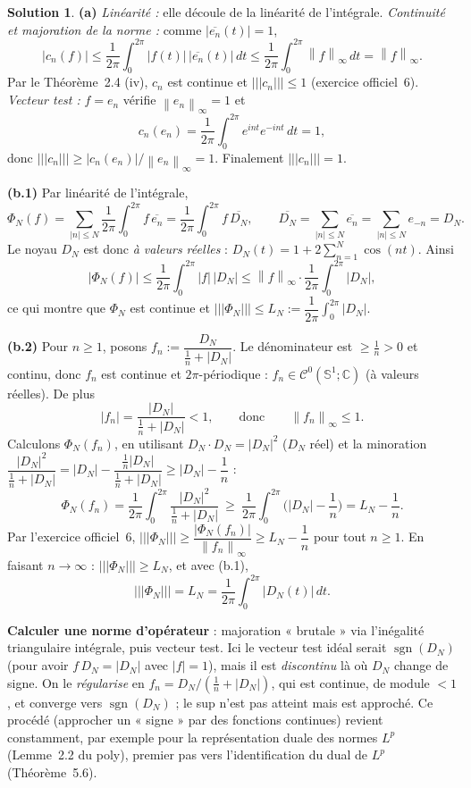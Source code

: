 \documentclass[11pt,a4paper]{article}
\newcommand{\C}{\mathbb{C}}
\newcommand{\Sun}{\mathbb{S}^1}
\newcommand{\norm}[1]{\left\|#1\right\|}
\newcommand{\opnorm}[1]{|\!|\!|#1|\!|\!|}
\newcommand{\Cz}{\mathcal{C}^0}
\DeclareMathOperator{\sgn}{sgn}
\theoremstyle{definition}
\newtheorem*{solution}{Solution}
\begin{document}
\begin{solution}
\noindent\textbf{(a)} \emph{Linéarité :} elle découle de la linéarité de l'intégrale. \emph{Continuité et majoration de la norme :} comme $|\overline{e_n}(t)|=1$,
\[
|c_n(f)|\le\frac1{2\pi}\int_0^{2\pi}|f(t)|\,|\overline{e_n}(t)|\,dt\le\frac1{2\pi}\int_0^{2\pi}\norm f_\infty\,dt=\norm f_\infty .
\]
Par le Théorème~2.4 (iv), $c_n$ est continue et $\opnorm{c_n}\le1$ (exercice officiel~6). \emph{Vecteur test :} $f=e_n$ vérifie $\norm{e_n}_\infty=1$ et
\[
c_n(e_n)=\frac1{2\pi}\int_0^{2\pi}e^{int}e^{-int}\,dt=1 ,
\]
donc $\opnorm{c_n}\ge|c_n(e_n)|/\norm{e_n}_\infty=1$. Finalement $\opnorm{c_n}=1$.

\medskip
\noindent\textbf{(b.1)} Par linéarité de l'intégrale,
\[
\Phi_N(f)=\sum_{|n|\le N}\frac1{2\pi}\int_0^{2\pi}f\,\overline{e_n}=\frac1{2\pi}\int_0^{2\pi}f\,\overline{D_N},
\qquad\overline{D_N}=\sum_{|n|\le N}\overline{e_n}=\sum_{|n|\le N}e_{-n}=D_N .
\]
Le noyau $D_N$ est donc \emph{à valeurs réelles} : $D_N(t)=1+2\sum_{n=1}^N\cos(nt)$. Ainsi
\[
|\Phi_N(f)|\le\frac1{2\pi}\int_0^{2\pi}|f|\,|D_N|\le\norm f_\infty\cdot\frac1{2\pi}\int_0^{2\pi}|D_N| ,
\]
ce qui montre que $\Phi_N$ est continue et $\opnorm{\Phi_N}\le L_N:=\dfrac1{2\pi}\displaystyle\int_0^{2\pi}|D_N|$.

\medskip
\noindent\textbf{(b.2)} Pour $n\ge1$, posons $f_n:=\dfrac{D_N}{\frac1n+|D_N|}$. Le dénominateur est $\ge\frac1n>0$ et continu, donc $f_n$ est continue et $2\pi$-périodique : $f_n\in\Cz(\Sun;\C)$ (à valeurs réelles). De plus
\[
|f_n|=\frac{|D_N|}{\frac1n+|D_N|}<1,\qquad\text{donc}\qquad\norm{f_n}_\infty\le1 .
\]
Calculons $\Phi_N(f_n)$, en utilisant $D_N\cdot D_N=|D_N|^2$ ($D_N$ réel) et la minoration $\dfrac{|D_N|^2}{\frac1n+|D_N|}=|D_N|-\dfrac{\frac1n|D_N|}{\frac1n+|D_N|}\ge|D_N|-\dfrac1n$ :
\[
\Phi_N(f_n)=\frac1{2\pi}\int_0^{2\pi}\frac{|D_N|^2}{\frac1n+|D_N|}\ \ge\ \frac1{2\pi}\int_0^{2\pi}\Big(|D_N|-\frac1n\Big)=L_N-\frac1n .
\]
Par l'exercice officiel~6, $\opnorm{\Phi_N}\ge\dfrac{|\Phi_N(f_n)|}{\norm{f_n}_\infty}\ge L_N-\dfrac1n$ pour tout $n\ge1$. En faisant $n\to\infty$ : $\opnorm{\Phi_N}\ge L_N$, et avec (b.1),
\[
\opnorm{\Phi_N}=L_N=\frac1{2\pi}\int_0^{2\pi}|D_N(t)|\,dt .
\]
\end{solution}

\begin{pointcle}
\textbf{Calculer une norme d'opérateur} : majoration « brutale » via l'inégalité triangulaire intégrale, puis vecteur test. Ici le vecteur test idéal serait $\sgn(D_N)$ (pour avoir $f\,D_N=|D_N|$ avec $|f|=1$), mais il est \emph{discontinu} là où $D_N$ change de signe. On le \emph{régularise} en $f_n=D_N/(\frac1n+|D_N|)$, qui est continue, de module $<1$, et converge vers $\sgn(D_N)$ ; le sup n'est pas atteint mais est approché. Ce procédé (approcher un « signe » par des fonctions continues) revient constamment, par exemple pour la représentation duale des normes $L^p$ (Lemme~2.2 du poly), premier pas vers l'identification du dual de $L^p$ (Théorème~5.6).
\end{pointcle}
\end{document}
